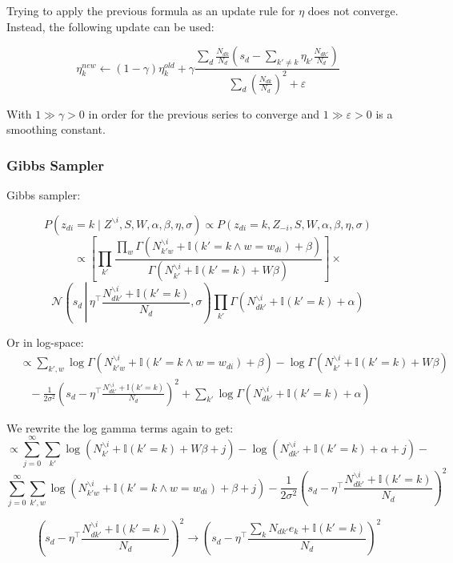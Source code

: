 \documentclass[a4paper,10pt]{article}
\renewcommand{\epsilon}{\varepsilon}
\begin{document}
Trying to apply the previous formula as an update rule for $\eta$ does not converge. Instead, the following update can be used:

$$ \eta_k^{new} \leftarrow (1 - \gamma) \eta_k^{old} + \gamma \frac{\sum_d \frac{N_{dk}}{N_d} \left( s_d - \sum_{k' \ne k} \eta_{k'} \frac{N_{dk'}}{N_d} \right)}{\sum_d \left( \frac{N_{dk}}{N_d}  \right)^2 + \epsilon}$$

With $1 \gg \gamma > 0$ in order for the previous series to converge and $1 \gg \epsilon > 0$ is a smoothing constant.

\subsubsection{Gibbs Sampler}
Gibbs sampler:

$$ P(z_{di} = k \mid Z^{\backslash i}, S, W, \alpha, \beta, \eta, \sigma) \propto P(z_{di} = k, Z_{-i}, S, W, \alpha, \beta, \eta, \sigma) $$
$$ \propto \left[ \prod_{k'} \frac{\prod_w \Gamma(N_{{k'}w}^{\backslash i} + \mathbb{I}(k' = k \wedge w = w_{di}) + \beta)}{\Gamma(N_{k'}^{\backslash i} + \mathbb{I}(k' = k) + W \beta)} \right] \times $$
$$ \mathcal{N}\left(s_d\, \left|\, \eta^\top\frac{N_{d{k'}}^{\backslash i} + \mathbb{I}(k' = k)}{N_d}, \sigma\right. \right) \prod_{k'} \Gamma(N_{d{k'}}^{\backslash i} + \mathbb{I}(k' = k) + \alpha) $$

Or in log-space:
\begin{align*}
&\propto \sum_{k',w} \log \Gamma(N_{{k'}w}^{\backslash i} + \mathbb{I}(k' = k \wedge w = w_{di}) + \beta) - \log \Gamma(N_{k'}^{\backslash i} + \mathbb{I}(k' = k) + W \beta)\\
&\hspace{10pt}-\frac{1}{2 \sigma^2}\left(s_d - \eta^\top \frac{N_{d{k'}}^{\backslash i} + \mathbb{I}(k' = k)}{N_d}\right)^2 + \sum_{k'} \log \Gamma(N_{d{k'}}^{\backslash i} + \mathbb{I}(k' = k) + \alpha)
\end{align*}
  


We rewrite the log gamma terms again to get:
\[\propto \sum_{j=0}^\infty \sum_{k'}\log(N_{k'}^{\backslash i} + \mathbb{I}(k' = k) + W \beta + j) 
-\log(N_{d{k'}}^{\backslash i} + \mathbb{I}(k' = k) + \alpha +j)-\]
\[\sum_{j=0}^\infty \sum_{k',w} \log(N_{{k'}w}^{\backslash i} + \mathbb{I}(k' = k \wedge w = w_{di}) + \beta + j) -\frac{1}{2 \sigma^2}\left(s_d - \eta^\top \frac{N_{d{k'}}^{\backslash i} + \mathbb{I}(k' = k)}{N_d}\right)^2\]

\[\left(s_d - \eta^\top \frac{N_{d{k'}}^{\backslash i} + \mathbb{I}(k' = k)}{N_d}\right)^2 \rightarrow \left(s_d - \eta^\top \frac{\sum_k N_{d{k'}}e_k  + \mathbb{I}(k' = k)}{N_d}\right)^2\]
\end{document}
